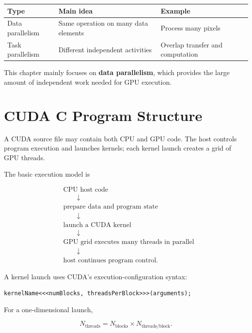 \documentclass[11pt,a4paper]{article}
\begin{document}
\begin{center}
\begin{tabular}{lll}
\toprule
Type & Main idea & Example \\
\midrule
Data parallelism & Same operation on many data elements & Process many pixels \\
Task parallelism & Different independent activities & Overlap transfer and computation \\
\bottomrule
\end{tabular}
\end{center}

This chapter mainly focuses on \textbf{data parallelism}, which provides the large amount of independent work needed for GPU execution.

\section{CUDA C Program Structure}

A CUDA source file may contain both CPU and GPU code. The host controls program execution and launches kernels; each kernel launch creates a grid of GPU threads.

The basic execution model is

\[
\begin{aligned}
&\text{CPU host code} \\
&\qquad\downarrow \\
&\text{prepare data and program state} \\
&\qquad\downarrow \\
&\text{launch a CUDA kernel} \\
&\qquad\downarrow \\
&\text{GPU grid executes many threads in parallel} \\
&\qquad\downarrow \\
&\text{host continues program control}.
\end{aligned}
\]

A kernel launch uses CUDA's execution-configuration syntax:

\begin{lstlisting}
kernelName<<<numBlocks, threadsPerBlock>>>(arguments);
\end{lstlisting}

For a one-dimensional launch,

\[
N_{\text{threads}}
=
N_{\text{blocks}}
\times
N_{\text{threads/block}}.
\]
\end{document}
